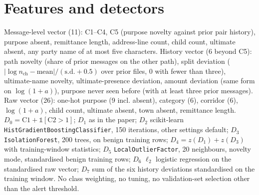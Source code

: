 \documentclass[conference]{IEEEtran}
\begin{document}
\section{Features and detectors}
Message-level vector (11): C1--C4, C5 (purpose novelty against prior pair
history), purpose absent, remittance length, address-line count, child
count, ultimate absent, any party name of at most five characters. History
vector (6 beyond C5): path novelty (share of prior messages on the other
path), split deviation ($|\log n_{\mathrm{ch}}-\text{mean}|/(\text{s.d.}+0.5)$
over prior files, 0 with fewer than three), ultimate-name novelty,
ultimate-presence deviation, amount deviation (same form on $\log(1+a)$),
purpose never seen before (with at least three prior messages). Raw vector
(26): one-hot purpose (9 incl. absent), category (6), corridor (6),
$\log(1+a)$, child count, ultimate absent, town absent, remittance length.
$D_0=\mathrm{C1}+\mathbb{1}[\mathrm{C2}>1]$; $D_1$ as in the paper; $D_2$
scikit-learn \texttt{HistGradientBoostingClassifier}, 150 iterations, other
settings default; $D_3$ \texttt{IsolationForest}, 200 trees, on benign
training rows; $D_4=z(D_1)+z(D_3)$ with training-window statistics; $D_5$
\texttt{LocalOutlierFactor}, 20 neighbours, novelty mode, standardised benign
training rows; $D_6$ $\ell_2$ logistic regression on the standardised raw
vector; $D_7$ sum of the six history deviations standardised on the training
window. No class weighting, no tuning, no validation-set selection other
than the alert threshold.
\end{document}
